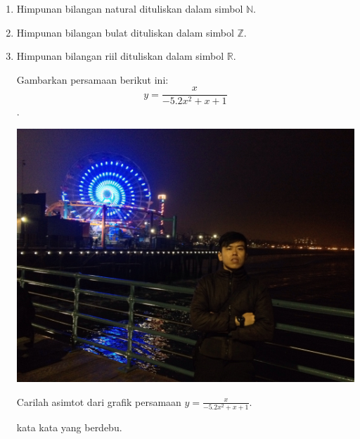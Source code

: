 \documentclass[11pt]{article}
\def\pers1{y=\frac{x}{-5.2x^2+x+1}}
\def\kata{kata kata yang berdebu.}
\begin{document}
\begin{enumerate}

\item Himpunan bilangan natural dituliskan dalam simbol $\mathbb{N}$.

\item Himpunan bilangan bulat dituliskan dalam simbol $\mathbb{Z}$.

\item Himpunan bilangan riil dituliskan dalam simbol $\mathbb{R}$. 

Gambarkan persamaan berikut ini:$$\pers1$$.

\begin{center}

\includegraphics[width=5in]{./santamon.jpg}

\end{center} 

Carilah asimtot dari grafik persamaan $\pers1$.

\kata

\end{enumerate}
\end{document}
